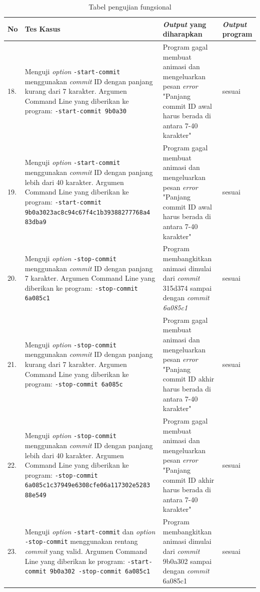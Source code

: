 \begin{table}[htbp]
	\centering
	\caption{Tabel pengujian fungsional}
	
		\begin{tabular}{|p{0.3cm}|>{\raggedright} p{7 cm}| p{5.5 cm}| p{3 cm}|} \hline
		No & Tes Kasus	& \textit{Output} yang diharapkan & \textit{Output} program \\ \hline

18. & Menguji \textit{option} \texttt{-start-commit} menggunakan \textit{commit} ID dengan panjang kurang dari 7 karakter. Argumen Command Line yang diberikan ke program: \texttt{-start-commit 9b0a30} & Program gagal membuat animasi dan mengeluarkan pesan \textit{error} "Panjang commit ID awal harus berada di antara 7-40 karakter" & sesuai  \\ \hline
		19.&  Menguji \textit{option} \texttt{-start-commit} menggunakan \textit{commit} ID dengan panjang lebih dari 40 karakter. Argumen Command Line yang diberikan ke program:  \texttt{-start-commit 9b0a3023ac8c94c67f4c1b39388277768a4 83dba9} & Program gagal membuat animasi dan mengeluarkan pesan \textit{error} "Panjang commit ID awal harus berada di antara 7-40 karakter" & sesuai  \\ \hline
		20. & Menguji \textit{option} \texttt{-stop-commit} menggunakan \textit{commit} ID dengan panjang 7 karakter. Argumen Command Line yang diberikan ke program:  \texttt{-stop-commit 6a085c1}  & Program membangkitkan animasi dimulai dari \textit{commit} 315d374 sampai dengan \textit{commit 6a085c1}  & sesuai  \\ \hline
		21. & Menguji \textit{option} \texttt{-stop-commit} menggunakan \textit{commit} ID dengan panjang kurang dari 7 karakter. Argumen Command Line yang diberikan ke program: \texttt{-stop-commit 6a085c} & Program gagal membuat animasi dan mengeluarkan pesan \textit{error} "Panjang commit ID akhir harus berada di antara 7-40 karakter" & sesuai  \\ \hline
		22. & Menguji \textit{option} \texttt{-stop-commit} menggunakan \textit{commit} ID dengan panjang lebih dari 40 karakter. Argumen Command Line yang diberikan ke program: \texttt{-stop-commit 6a085c1c37949e6308cfe06a117302e5283 88e549} & Program gagal membuat animasi dan mengeluarkan pesan \textit{error} "Panjang commit ID akhir harus berada di antara 7-40 karakter"  & sesuai  \\ \hline
		23. & Menguji \textit{option} \texttt{-start-commit} dan \textit{option} \texttt{-stop-commit} menggunakan rentang \textit{commit} yang valid. Argumen Command Line yang diberikan ke program: \texttt{-start-commit 9b0a302 -stop-commit 6a085c1} & Program membangkitkan animasi dimulai dari \textit{commit} 9b0a302 sampai dengan \textit{commit} 6a085c1 & sesuai  \\ \hline

\end{tabular}
\end{table}
